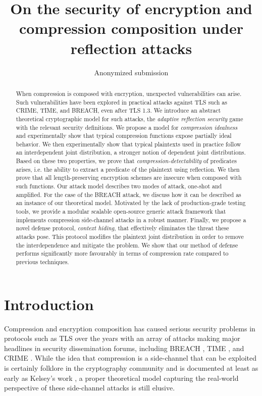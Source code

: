 \documentclass[conference, letterpaper, 10pt]{IEEEtran}
\title{On the security of encryption and compression composition under reflection attacks}
\author{
    Anonymized submission
}
\begin{document}
\maketitle

\begin{abstract}
When compression is composed with encryption, unexpected vulnerabilities can
arise. Such vulnerabilities have been explored in practical attacks against TLS
such as CRIME, TIME, and BREACH, even after TLS 1.3. We introduce an abstract
theoretical cryptographic model for such attacks, the \textit{adaptive
reflection security} game with the relevant security definitions. We propose a
model for \textit{compression idealness} and experimentally show that typical compression
functions expose partially ideal behavior. We then experimentally show that
typical plaintexts used in practice follow an interdependent joint distribution,
a stronger notion of dependent joint distributions. Based on these two
properties, we prove that \textit{compression-detectability} of predicates
arises, i.e. the ability to extract a predicate of the plaintext using reflection.
We then prove that all length-preserving encryption schemes are insecure when
composed with such functions. Our attack model describes two modes of attack,
one-shot and amplified. For the case of the BREACH attack, we discuss how it can
be described as an instance of our theoretical model. Motivated by the lack of
production-grade testing tools, we provide a modular scalable open-source
generic attack framework that implements compression side-channel attacks in a
robust manner. Finally, we propose a novel defense protocol, \textit{context
hiding}, that effectively eliminates the threat these attacks pose. This
protocol modifies the plaintext joint distribution in order to remove the
interdependence and mitigate the problem. We show that our method of
defense performs significantly more favourably in terms of compression rate
compared to previous techniques.
\end{abstract}

\section{Introduction}\label{sec:prev}

Compression and encryption composition has caused serious security problems
in protocols such as TLS \cite{c1} over the years
with an array of attacks making major headlines in security dissemination forums,
including BREACH \cite{c2}, TIME \cite{c3}, and CRIME \cite{c4}.
While the idea that compression is a side-channel that can be exploited
is certainly folklore in the cryptography community and is documented
at least as early as Kelsey's work \cite{c12},
a proper theoretical model  capturing the real-world perspective
of these side-channel attacks is still elusive.
\end{document}
